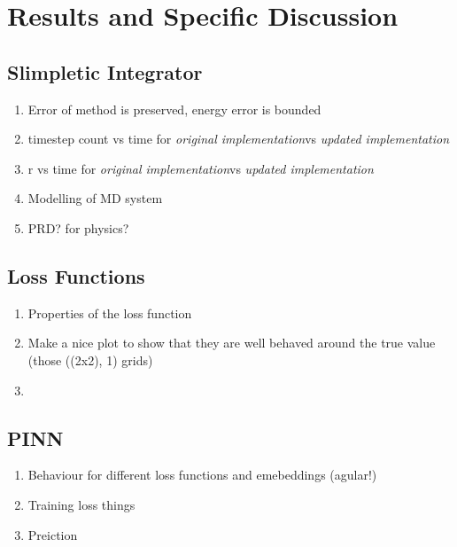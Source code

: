 \documentclass[10pt]{iopart}
\def\SI{Slimpletic Integrator}
\newcommand{\orgimpl}{\textit{original implementation}}
\newcommand{\updimpl}{\textit{updated implementation}}
\begin{document}





\section{Results and Specific Discussion}
\subsection{\SI{}}

\begin{enumerate}
	\item Error of method is preserved, energy error is bounded
	\item timestep count vs time for \orgimpl vs \updimpl
	\item r vs time for \orgimpl vs \updimpl
	\item Modelling of MD system
	\item PRD? for physics?
\end{enumerate}


\subsection{Loss Functions}

\begin{enumerate}
	\item Properties of the loss function
	\item Make a nice plot to show that they are well behaved around the true value (those ((2x2), 1) grids)
	\item 
\end{enumerate}

\subsection{PINN}

\begin{enumerate}
	\item Behaviour for different loss functions and emebeddings (agular!)
	\item Training loss things
	\item Preiction
\end{enumerate}
\end{document}
